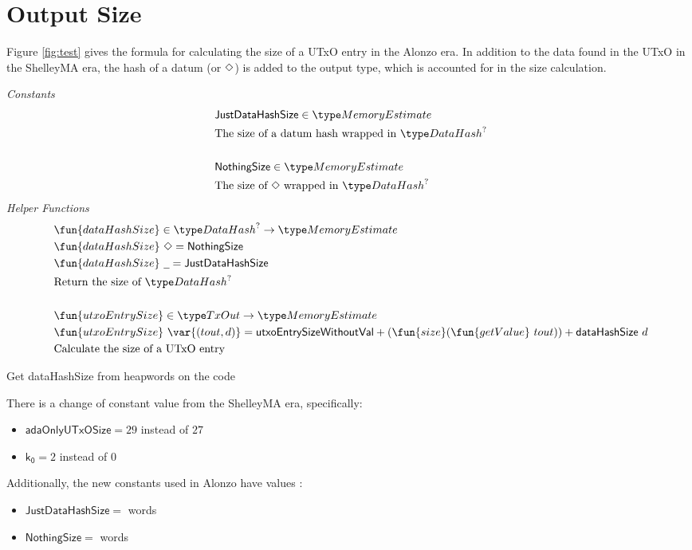 \section{Output Size}
\label{sec:value-size}

Figure \ref{fig:test} gives the formula for calculating the size of a UTxO entry
in the Alonzo era. In addition to the data found in the UTxO in the ShelleyMA
era, the hash of a datum (or $\Diamond$) is added to the output type, which
is accounted for in the size calculation.

\begin{figure*}[h]
  \emph{Constants}
  \begin{align*}
  & \mathsf{JustDataHashSize} \in \MemoryEstimate \\
  & \text{The size of a datum hash wrapped in $\DataHash^?$} \\~
  \\
  & \mathsf{NothingSize} \in \MemoryEstimate \\
  & \text{The size of $\Nothing$ wrapped in $\DataHash^?$}
  \end{align*}
  \emph{Helper Functions}
  \begin{align*}
    & \fun{dataHashSize} \in \DataHash^? \to \MemoryEstimate \\
    & \fun{dataHashSize}~ \Nothing = \mathsf{NothingSize} \\
    & \fun{dataHashSize}~ \wcard = \mathsf{JustDataHashSize} \\
    & \text{Return the size of $\DataHash^?$} \\~\\
    & \fun{utxoEntrySize} \in \TxOut \to \MemoryEstimate \\
    & \fun{utxoEntrySize}~\var{(tout, d)} = \mathsf{utxoEntrySizeWithoutVal} + (\fun{size} (\fun{getValue}~tout)) + \mathsf{dataHashSize}~d \\
    & \text{Calculate the size of a UTxO entry}
  \end{align*}
  \caption{Value Size}
  \label{fig:test}
\end{figure*}

\begin{note}
  Get dataHashSize from heapwords on the code
\end{note}

There is a change of constant value from the ShelleyMA era, specifically:

\begin{itemize}
  \item $\mathsf{adaOnlyUTxOSize} = 29$ instead of $27$
  \item $\mathsf{k_0} = 2$ instead of $0$
\end{itemize}

Additionally, the new constants used in Alonzo have values :

\begin{itemize}
  \item $\mathsf{JustDataHashSize} = $ words
  \item $\mathsf{NothingSize} = $ words
\end{itemize}
